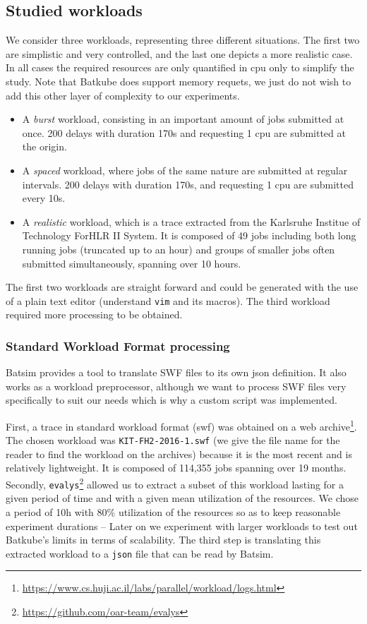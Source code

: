 \subsection{Studied workloads} \label{sec:studied-workloads}

We consider three workloads, representing three different situations. The first
two are simplistic and very controlled, and the last one depicts a more
realistic case. In all cases the required resources are only quantified in cpu
only to simplify the study. Note that Batkube does support memory requets, we
just do not wish to add this other layer of complexity to our experiments.

\begin{itemize}
	\item A \textit{burst} workload, consisting in an important amount of
		jobs submitted at once.  200 delays with duration 170s and
		requesting 1 cpu are submitted at the origin.
	\item A \textit{spaced} workload, where jobs of the same nature are
		submitted at regular intervals.  200 delays with duration 170s,
		and requesting 1 cpu are submitted every 10s.
	\item A \textit{realistic} workload, which is a trace extracted from
		the Karlsruhe Institue of Technology ForHLR II System. It is
		composed of 49 jobs including both long running jobs (truncated
		up to an hour) and groups of smaller jobs often submitted
		simultaneously, spanning over 10 hours.
\end{itemize}

The first two workloads are straight forward and could be generated with the
use of a plain text editor (understand \texttt{vim} and its macros). The third
workload required more processing to be obtained.  

\subsubsection{Standard Workload Format processing}

Batsim provides a tool to translate SWF files to its own json definition. It
also works as a workload preprocessor, although we want to process SWF files
very specifically to suit our needs which is why a custom script was
implemented.

First, a trace in standard workload format (swf) was obtained on a web
archive\footnote{\url{https://www.cs.huji.ac.il/labs/parallel/workload/logs.html}}.
The chosen workload was \texttt{KIT-FH2-2016-1.swf} (we give the file name for
the reader to find the workload on the archives) because it is the most recent
and is relatively lightweight. It is composed of 114,355 jobs spanning over 19
months. Secondly, \texttt{evalys}\footnote{\url{https://github.com/oar-team/evalys}}
allowed us to extract a subset of this workload lasting for a given period of
time and with a given mean utilization of the resources. We chose a period of
10h with 80\% utilization of the resources so as to keep reasonable experiment
durations -- Later on we experiment with larger workloads to test out Batkube's
limits in terms of scalability.  The third step is translating this extracted
workload to a \texttt{json} file that can be read by Batsim.

